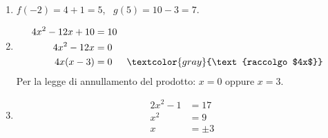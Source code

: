 \begin{question}[ID=1.2, subtitle={Composizione di funzioni polinomiali}, difficulty=facile, tags={funzioni, composizione}]
\begin{explanation}
\begin{enumerate}
    \item $f(-2)=4+1=5$, \ $g(5)=10-3=7$.
    \item \[\begin{aligned}
    4x^2-12x+10 &= 10\\
    4x^2-12x &= 0\\
    4x(x-3) &= 0 && \textcolor{gray}{\text{raccolgo $4x$}}
    \end{aligned}\]
    Per la legge di annullamento del prodotto: $x=0$ oppure $x=3$.
    \item \[\begin{aligned}
    2x^2-1 &= 17\\
    x^2 &= 9\\
    x &= \pm3
    \end{aligned}\]
\end{enumerate}
\end{explanation}
\end{question}



